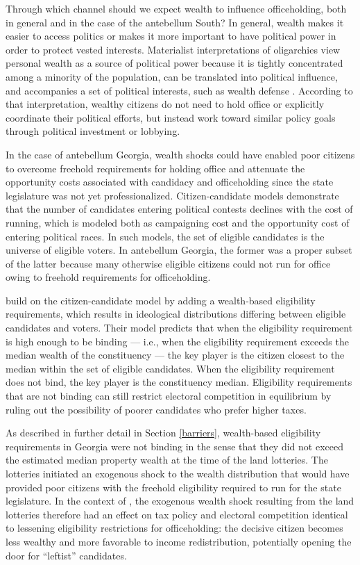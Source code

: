 Through which channel should we expect wealth to influence officeholding, both in general and in the case of the antebellum South? In general, wealth makes it easier to access politics or makes it more important to have political power in order to protect vested interests. Materialist interpretations of oligarchies view personal wealth as a source of political power because it is tightly concentrated among a minority of the population, can be translated into political influence, and accompanies a set of political interests, such as wealth defense \citep{winters2009}. According to that interpretation, wealthy citizens do not need to hold office or explicitly coordinate their political efforts, but instead work toward similar policy goals through political investment or lobbying.

In the case of antebellum Georgia, wealth shocks could have enabled poor citizens to overcome freehold requirements for holding office and attenuate the opportunity costs associated with candidacy and officeholding since the state legislature was not yet professionalized. Citizen-candidate models \citep{osborne1996,besley1997} demonstrate that the number of candidates entering political contests declines with the cost of running, which is modeled both as campaigning cost and the opportunity cost of entering political races. In such models, the set of eligible candidates is the universe of eligible voters. In antebellum Georgia, the former was a proper subset of the latter because many otherwise eligible citizens could not run for office owing to freehold requirements for officeholding.

\citet{corvalan2018political} build on the citizen-candidate model by adding a wealth-based eligibility requirements, which results in ideological distributions differing between eligible candidates and voters. Their model predicts that when the eligibility requirement is high enough to be binding --- i.e., when the eligibility requirement exceeds the median wealth of the constituency --- the key player is the citizen closest to the median within the set of eligible candidates. When the eligibility requirement does not bind, the key player is the constituency median. Eligibility requirements that are not binding can still restrict electoral competition in equilibrium by ruling out the possibility of poorer candidates who prefer higher taxes.

As described in further detail in Section \ref{barriers}, wealth-based eligibility requirements in Georgia were not binding in the sense that they did not exceed the estimated median property wealth at the time of the land lotteries. The lotteries initiated an exogenous shock to the wealth distribution that would have provided poor citizens with the freehold eligibility required to run for the state legislature. In the context of \citet{corvalan2018political}, the exogenous wealth shock resulting from the land lotteries therefore had an  effect on tax policy and electoral competition identical to lessening eligibility restrictions for officeholding: the decisive citizen becomes less wealthy and more favorable to income redistribution, potentially opening the door for ``leftist'' candidates.  

